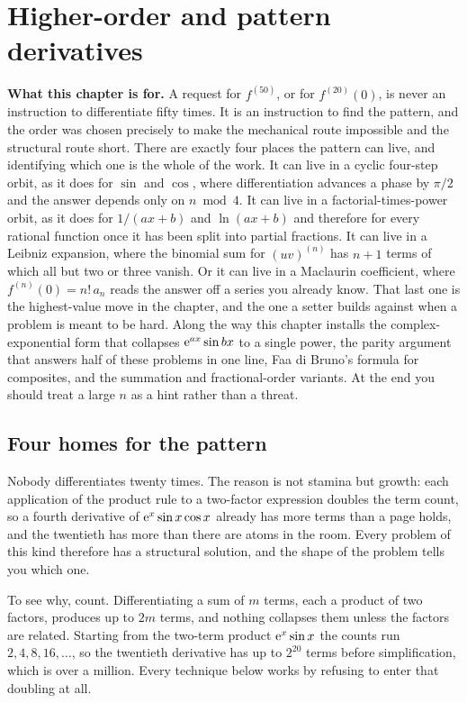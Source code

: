 \chapter{Higher-order and pattern derivatives}

\begin{orient}
\textbf{What this chapter is for.} A request for $f^{(50)}$, or for $f^{(20)}(0)$, is never an instruction to differentiate fifty times. It is an instruction to find the pattern, and the order was chosen precisely to make the mechanical route impossible and the structural route short. There are exactly four places the pattern can live, and identifying which one is the whole of the work. It can live in a cyclic four-step orbit, as it does for $\sin$ and $\cos$, where differentiation advances a phase by $\pi/2$ and the answer depends only on $n\bmod4$. It can live in a factorial-times-power orbit, as it does for $1/(ax+b)$ and $\ln(ax+b)$ and therefore for every rational function once it has been split into partial fractions. It can live in a Leibniz expansion, where the binomial sum for $(uv)^{(n)}$ has $n+1$ terms of which all but two or three vanish. Or it can live in a Maclaurin coefficient, where $f^{(n)}(0)=n!\,a_{n}$ reads the answer off a series you already know. That last one is the highest-value move in the chapter, and the one a setter builds against when a problem is meant to be hard. Along the way this chapter installs the complex-exponential form that collapses $\mathrm{e}^{ax}\sin bx$ to a single power, the parity argument that answers half of these problems in one line, Faa di Bruno's formula for composites, and the summation and fractional-order variants. At the end you should treat a large $n$ as a hint rather than a threat.
\end{orient}

\section{Four homes for the pattern}

Nobody differentiates twenty times. The reason is not stamina but growth: each application of the product rule to a two-factor expression doubles the term count, so a fourth derivative of $\mathrm{e}^{x}\sin x\cos x$ already has more terms than a page holds, and the twentieth has more than there are atoms in the room. Every problem of this kind therefore has a structural solution, and the shape of the problem tells you which one.

To see why, count. Differentiating a sum of $m$ terms, each a product of two factors, produces up to $2m$ terms, and nothing collapses them unless the factors are related. Starting from the two-term product $\mathrm{e}^{x}\sin x$ the counts run $2,4,8,16,\dots$, so the twentieth derivative has up to $2^{20}$ terms before simplification, which is over a million. Every technique below works by refusing to enter that doubling at all.

